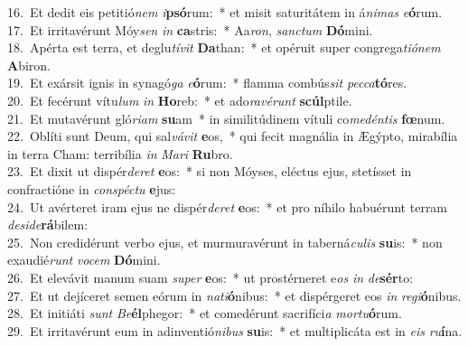 {16.~}Et dedit eis petitió\textit{nem} \textit{i}\textbf{psó}rum:~* et misit saturitátem in á\textit{ni}\textit{mas} \textit{e}\textbf{ó}rum.\\
{17.~}Et irritavérunt Móy\textit{sen} \textit{in} \textbf{ca}stris:~* Aa\textit{ron}, \textit{san}\textit{ctum} \textbf{Dó}mini.\\
{18.~}Apérta est terra, et deglu\textit{tí}\textit{vit} \textbf{Da}than:~* et opéruit super congrega\textit{ti}\textit{ó}\textit{nem} \textbf{A}biron.\\
{19.~}Et exársit ignis in synagó\textit{ga} \textit{e}\textbf{ó}rum:~* flamma combús\textit{sit} \textit{pec}\textit{ca}\textbf{tó}res.\\
{20.~}Et fecérunt vítu\textit{lum} \textit{in} \textbf{Ho}reb:~* et ado\textit{ra}\textit{vé}\textit{runt} \textbf{scúl}ptile.\\
{21.~}Et mutavérunt gló\textit{ri}\textit{am} \textbf{su}am~* in similitúdinem vítuli co\textit{me}\textit{dén}\textit{tis} \textbf{fœ}num.\\
{22.~}Oblíti sunt Deum, qui sal\textit{vá}\textit{vit} \textbf{e}os,~* qui fecit magnália in Ægýpto, mirabília in terra Cham: terribília \textit{in} \textit{Ma}\textit{ri} \textbf{Ru}bro.\\
{23.~}Et dixit ut dispér\textit{de}\textit{ret} \textbf{e}os:~* si non Móyses, eléctus ejus, stetísset in confractióne in \textit{con}\textit{spé}\textit{ctu} \textbf{e}jus:\\
{24.~}Ut avérteret iram ejus ne dispér\textit{de}\textit{ret} \textbf{e}os:~* et pro níhilo habuérunt terram \textit{de}\textit{si}\textit{de}\textbf{rá}bilem:\\
{25.~}Non credidérunt verbo ejus, et murmuravérunt in taberná\textit{cu}\textit{lis} \textbf{su}is:~* non exaudié\textit{runt} \textit{vo}\textit{cem} \textbf{Dó}mini.\\
{26.~}Et elevávit manum suam \textit{su}\textit{per} \textbf{e}os:~* ut prostérneret e\textit{os} \textit{in} \textit{de}\textbf{sér}to:\\
{27.~}Et ut dejíceret semen eórum in \textit{na}\textit{ti}\textbf{ó}nibus:~* et dispérgeret eos \textit{in} \textit{re}\textit{gi}\textbf{ó}nibus.\\
{28.~}Et initiáti \textit{sunt} \textit{Be}\textbf{él}phegor:~* et comedérunt sacrifíci\textit{a} \textit{mor}\textit{tu}\textbf{ó}rum.\\
{29.~}Et irritavérunt eum in adinventió\textit{ni}\textit{bus} \textbf{su}is:~* et multiplicáta est in \textit{e}\textit{is} \textit{ru}\textbf{í}na.\\
